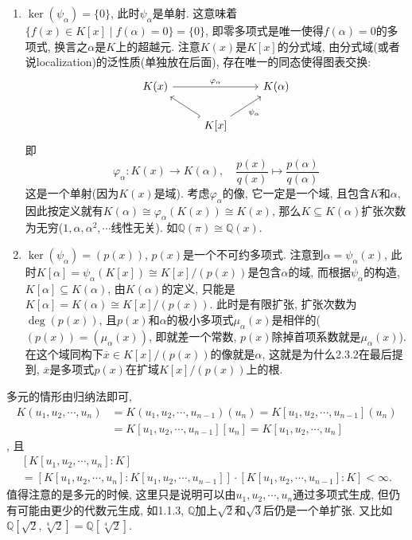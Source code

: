 \documentclass{../solutions-cn}
\begin{document}
\begin{remark}
    \begin{enumerate}
        \item $\ker(\psi_\alpha) = \{0\}$, 此时$\psi_\alpha$是单射. 这意味着$\{f(x) \in K[x] \mid f(\alpha) = 0\} = \{0\}$, 即零多项式是唯一使得$f(\alpha) = 0$的多项式, 换言之$\alpha$是$K$上的超越元. 注意$K(x)$是$K[x]$的分式域, 由分式域(或者说localization)的泛性质(单独放在后面), 存在唯一的同态使得图表交换:
        \[
            \begin{tikzcd}
                K(x) \arrow[rr, "\varphi_\alpha"] &                                                    & K(\alpha) \\
                                                  & {K[x]} \arrow[ru, "\psi_\alpha"'] \arrow[lu, hook] &          
            \end{tikzcd}
        \]
        即
        \[
            \varphi_\alpha:K(x) \to K(\alpha),\quad \frac{p(x)}{q(x)} \mapsto \frac{p(\alpha)}{q(\alpha)}
        \]
        这是一个单射(因为$K(x)$是域). 考虑$\varphi_\alpha$的像, 它一定是一个域, 且包含$K$和$\alpha$, 因此按定义就有$K(\alpha) \cong \varphi_\alpha(K(x)) \cong K(x)$, 那么$K \subseteq K(\alpha)$扩张次数为无穷($1, \alpha, \alpha^2, \cdots$线性无关). 如$\mathbb{Q}(\pi) \cong \mathbb{Q}(x)$.
        \item $\ker(\psi_\alpha) = (p(x))$, $p(x)$是一个不可约多项式. 注意到$\alpha = \psi_\alpha(x)$, 此时$K[\alpha] = \psi_\alpha(K[x]) \cong K[x]/(p(x))$是包含$\alpha$的域, 而根据$\psi_\alpha$的构造, $K[\alpha] \subseteq K(\alpha)$, 由$K(\alpha)$的定义, 只能是$K[\alpha] = K(\alpha) \cong K[x]/(p(x))$. 此时是有限扩张, 扩张次数为$\deg(p(x))$, 且$p(x)$和$\alpha$的极小多项式$\mu_\alpha(x)$是相伴的($(p(x)) = (\mu_\alpha(x))$, 即就差一个常数, $p(x)$除掉首项系数就是$\mu_\alpha(x)$). 在这个域同构下$\overline{x} \in K[x]/(p(x))$的像就是$\alpha$, 这就是为什么2.3.2在最后提到, $\overline{x}$是多项式$p(x)$在扩域$K[x]/(p(x))$上的根. 
    \end{enumerate}
    多元的情形由归纳法即可,
    \[
    \begin{aligned}
        K(u_1, u_2, \cdots, u_n) &= K(u_1, u_2, \cdots, u_{n - 1})(u_n) = K[u_1, u_2, \cdots, u_{n - 1}](u_n)\\
        &= K[u_1, u_2, \cdots, u_{n - 1}][u_n] = K[u_1, u_2, \cdots, u_n]
    \end{aligned} 
    \],
    且
    \[
    \begin{multlined}
        \left[K[u_1, u_2, \cdots, u_n]:K\right]\\
        = \left[K[u_1, u_2, \cdots, u_n]: K[u_1, u_2, \cdots, u_{n - 1}]\right] \cdot \left[K[u_1, u_2, \cdots, u_{n - 1}]:K\right] < \infty.
    \end{multlined}
    \]
    值得注意的是多元的时候, 这里只是说明可以由$u_1, u_2, \cdots, u_n$通过多项式生成, 但仍有可能由更少的代数元生成, 如1.1.3, $\mathbb{Q}$加上$\sqrt{2}$和$\sqrt{3}$后仍是一个单扩张. 又比如$\mathbb{Q}[\sqrt{2}, \sqrt[4]{2}] = \mathbb{Q}[\sqrt[4]{2}]$.


\end{remark}
\end{document}

